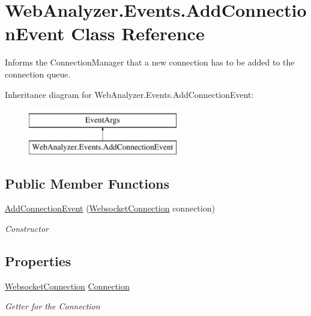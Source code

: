 \hypertarget{class_web_analyzer_1_1_events_1_1_add_connection_event}{}\section{Web\+Analyzer.\+Events.\+Add\+Connection\+Event Class Reference}
\label{class_web_analyzer_1_1_events_1_1_add_connection_event}


Informs the Connection\+Manager that a new connection has to be added to the connection queue.  


Inheritance diagram for Web\+Analyzer.\+Events.\+Add\+Connection\+Event\+:\begin{figure}[H]
\begin{center}
\leavevmode
\includegraphics[height=2.000000cm]{class_web_analyzer_1_1_events_1_1_add_connection_event}
\end{center}
\end{figure}
\subsection*{Public Member Functions}
\begin{DoxyCompactItemize}
\item 
\hyperlink{class_web_analyzer_1_1_events_1_1_add_connection_event_a647bfe795648d92f6139fb4d4e3f28fb}{Add\+Connection\+Event} (\hyperlink{class_web_analyzer_1_1_server_1_1_websocket_connection}{Websocket\+Connection} connection)
\begin{DoxyCompactList}\small\item\em Constructor \end{DoxyCompactList}\end{DoxyCompactItemize}
\subsection*{Properties}
\begin{DoxyCompactItemize}
\item 
\hyperlink{class_web_analyzer_1_1_server_1_1_websocket_connection}{Websocket\+Connection} \hyperlink{class_web_analyzer_1_1_events_1_1_add_connection_event_a0ae15899a3e51b1831f5f310436de660}{Connection}
\begin{DoxyCompactList}\small\item\em Getter for the Connection \end{DoxyCompactList}\end{DoxyCompactItemize}
